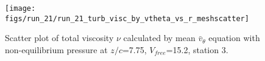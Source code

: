\begin{figure}[H]
\centering
\texttt{[image: figs/run\_21/run\_21\_turb\_visc\_by\_vtheta\_vs\_r\_meshscatter]}
\caption{Scatter plot of total viscosity $\nu$ calculated by mean $\bar{v}_{\theta}$ equation with non-equilibrium pressure at $z/c$=7.75, $V_{free}$=15.2, station 3.}
\label{fig:run_21_turb_visc_by_vtheta_vs_r_meshscatter}
\end{figure}


